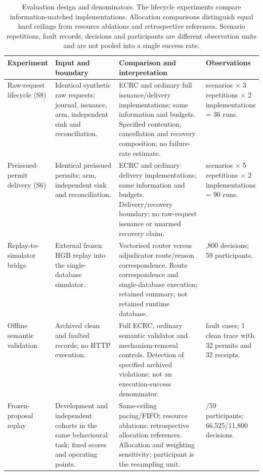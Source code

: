 \begin{table}[!htbp]
\centering
\small
\setlength{\tabcolsep}{4pt}
\renewcommand{\arraystretch}{1.12}
\caption{Evaluation design and denominators. The lifecycle experiments compare information-matched implementations. Allocation comparisons distinguish equal hard ceilings from resource ablations and retrospective references. Scenario repetitions, fault records, decisions and participants are different observation units and are not pooled into a single success rate.}
\label{tab:evaluation-design}
\begin{tabularx}{\linewidth}{@{}>{\raggedright\arraybackslash}p{0.17\linewidth}>{\raggedright\arraybackslash}p{0.25\linewidth}>{\raggedright\arraybackslash}X>{\raggedright\arraybackslash}p{0.18\linewidth}@{}}
\toprule
Experiment & Input and boundary & Comparison and interpretation & Observations\\
\midrule
Raw-request lifecycle (S8) & Identical synthetic raw requests; journal, issuance, arm, independent sink and reconciliation. & ECRC and ordinary full issuance/delivery implementations; same information and budgets. Specified contention, cancellation and recovery composition; no failure-rate estimate. & 6 scenarios $\times$ 3 repetitions $\times$ 2 implementations = 36 runs. \\
Preissued-permit delivery (S6) & Identical preissued permits; arm, independent sink and reconciliation. & ECRC and ordinary delivery implementations; same information and budgets. Delivery/recovery boundary; no raw-request issuance or unarmed recovery claim. & 9 scenarios $\times$ 5 repetitions $\times$ 2 implementations = 90 runs. \\
Replay-to-simulator bridge & External frozen HGB replay into the single-database simulator. & Vectorised router versus adjudicator route/reason correspondence. Route correspondence and single-database execution; retained summary, not retained runtime database. & 11,800 decisions; 59 participants. \\
Offline semantic validation & Archived clean and faulted records; no HTTP execution. & Full ECRC, ordinary semantic validator and mechanism-removal controls. Detection of specified archived violations; not an execution-success denominator. & 84 fault cases; 1 clean trace with 32 permits and 32 receipts. \\
Frozen-proposal replay & Development and independent cohorts in the same behavioural task; fixed scores and operating points. & Same-ceiling pacing/FIFO; resource ablations; retrospective allocation references. Allocation and weighting sensitivity; participant is the resampling unit. & 617/59 participants; 66,525/11,800 decisions. \\

\end{tabularx}
\end{table}
